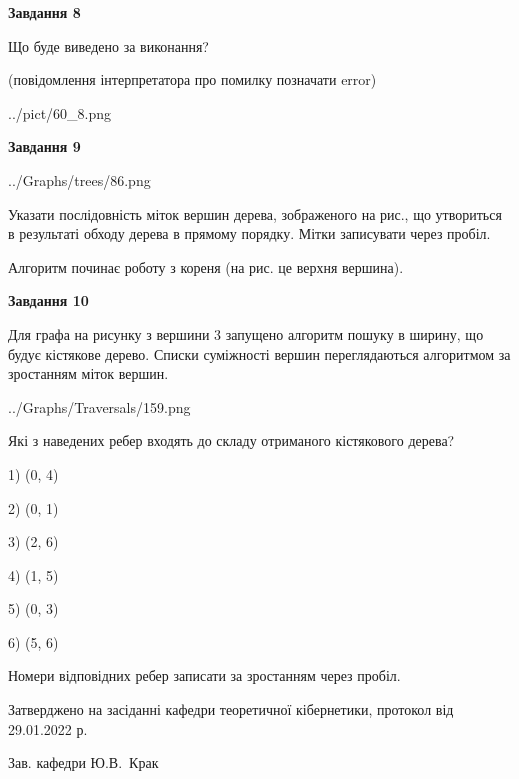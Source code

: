 \documentclass[12pt, ukrainian]{article}
\begin{document}
{\begin {large}
{\begin {center}\textbf{Завдання 8}\end {center}}\par
Що буде виведено за виконання?\par
 (повідомлення інтерпретатора про помилку позначати error)\par
\begin{center}
	{../pict/60_8.png}
\end{center}
\newpage

{\begin {center}\textbf{Завдання 9}\end {center}}\par

\begin{center}
	{../Graphs/trees/86.png}
\end{center}
Указати послідовність міток вершин дерева, зображеного на рис., що утвориться в результаті обходу дерева в прямому порядку. Мітки записувати через пробіл.\par Алгоритм починає роботу з кореня (на рис. це верхня вершина).\par
\newpage

{\begin {center}\textbf{Завдання 10}\end {center}}\par
Для графа на рисунку з вершини 3 запущено алгоритм пошуку в ширину, що будує кістякове дерево. Списки суміжності вершин переглядаються алгоритмом за зростанням міток вершин.\par
\begin{center}
	{../Graphs/Traversals/159.png}
\end{center}
\par Які з наведених ребер входять до складу отриманого кістякового дерева?\par
1) (0, 4)\par
2) (0, 1)\par
3) (2, 6)\par
4) (1, 5)\par
5) (0, 3)\par
6) (5, 6)\par
{\vskip 15pt} Номери відповідних ребер записати за зростанням через пробіл.\par
\newpage


\end {large}
}
{\smallskip \begin {small} Затверджено на засіданні кафедри теоретичної кібернетики, протокол  від   29.01.2022 р.\par\smallskip\smallskip
{\parbox {6.5 cm}{Зав. кафедри \dotfill Ю.В.~Крак}} \end{small}}
\end{document}

